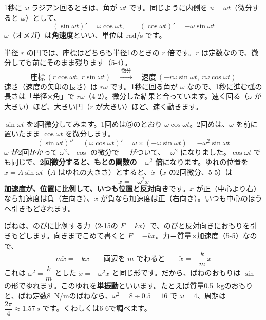 1秒に $\omega$ ラジアン回るときは、角が $\omega t$ です。同じように内側を $u=\omega t$（微分すると $\omega$）として、
\[ (\sin\omega t)'=\omega\cos\omega t,\qquad (\cos\omega t)'=-\omega\sin\omega t \]
$\omega$（オメガ）は\textbf{角速度}といい、単位は rad/s です。

半径 $r$ の円では、座標はどちらも半径1のときの $r$ 倍です。$r$ は定数なので、微分しても前にそのまま残ります（5-4）。
\[ \text{座標}\ (r\cos\omega t,\ r\sin\omega t)\quad\xrightarrow{\ \text{微分}\ }\quad\text{速度}\ (-r\omega\sin\omega t,\ r\omega\cos\omega t) \]
速さ（速度の矢印の長さ）は $r\omega$ です。1秒に回る角が $\omega$ なので、1秒に進む弧の長さは「半径×角」で $r\omega$（4-2）。微分した結果と合っています。速く回る（$\omega$ が大きい）ほど、大きい円（$r$ が大きい）ほど、速く動きます。


\label{bk:5-15:nikai}$\sin\omega t$ を2回微分してみます。1回めは⑤のとおり $\omega\cos\omega t$。2回めは、$\omega$ を前に置いたまま $\cos\omega t$ を微分します。
\[ (\sin\omega t)''=(\omega\cos\omega t)'=\omega\times(-\omega\sin\omega t)=-\omega^2\sin\omega t \]
$\omega$ が2回かかって $\omega^2$、$\cos$ の微分で $-$ がついて、$-\omega^2$ になりました。$\cos\omega t$ でも同じで、\textbf{2回微分すると、もとの関数の $-\omega^2$ 倍}になります。ゆれの位置を $x=A\sin\omega t$（$A$ はゆれの大きさ）とすると、$\ddot{x}$（$x$ の2回微分、5-5）は
\[ \ddot{x}=-\omega^2x \]
\textbf{加速度が、位置に比例して、いつも位置と反対向き}です。$x$ が正（中心より右）なら加速度は負（左向き）、$x$ が負なら加速度は正（右向き）。いつも中心のほうへ引きもどされます。

ばねは、のびに比例する力（2-15の $F=kx$）で、のびと反対向きにおもりを引きもどします。向きまでこめて書くと $F=-kx$。力＝質量×加速度（5-5）なので、
\[ m\ddot{x}=-kx\qquad\text{両辺を }m\text{ でわると}\qquad \ddot{x}=-\frac{k}{m}\,x \]
これは $\omega^2=\dfrac{k}{m}$ とした $\ddot{x}=-\omega^2x$ と同じ形です。だから、ばねのおもりは $\sin$ の形でゆれます。このゆれを\textbf{単振動}といいます。たとえば質量\qty{0.5}{kg}のおもりと、ばね定数\qty{8}{N/m}のばねなら、$\omega^2=8\div0.5=16$ で $\omega=4$、周期は $\dfrac{2\pi}{4}\approx\qty{1.57}{s}$ です。くわしくは6-6で調べます。

